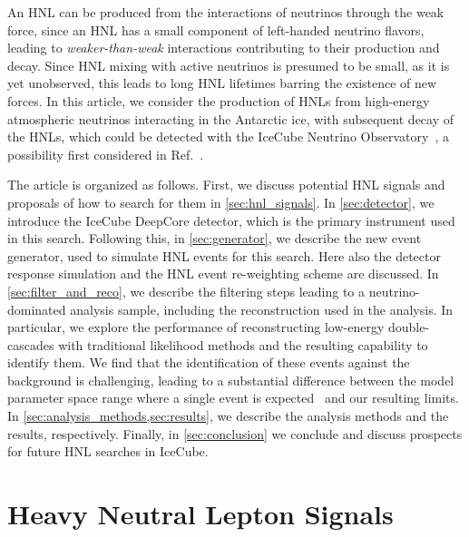 \documentclass[
    aps,
    prd,
    reprint,
    amsmath,
    amssymb,
    nofootinbib,
    superscriptaddress,
    floatfix
]{revtex4-2}
\begin{document}
An HNL can be produced from the interactions of neutrinos through the weak force, since an HNL has a small component of left-handed neutrino flavors, leading to \textit{weaker-than-weak} interactions contributing to their production and decay.
Since HNL mixing with active neutrinos is presumed to be small, as it is yet unobserved, this leads to long HNL lifetimes barring the existence of new forces.
In this article, we consider the production of HNLs from high-energy atmospheric neutrinos interacting in the Antarctic ice, with subsequent decay of the HNLs, which could be detected with the IceCube Neutrino Observatory~\cite{IceCube:2016zyt}, a possibility first considered in Ref.~\cite{Coloma:2017ppo}.

The article is organized as follows.
First, we discuss potential HNL signals and proposals of how to search for them in \cref{sec:hnl_signals}.
In \cref{sec:detector}, we introduce the IceCube DeepCore detector, which is the primary instrument used in this search.
Following this, in \cref{sec:generator}, we describe the new event generator, used to simulate HNL events for this search.
Here also the detector response simulation and the HNL event re-weighting scheme are discussed.
In \cref{sec:filter_and_reco}, we describe the filtering steps leading to a neutrino-dominated analysis sample, including the reconstruction used in the analysis.
In particular, we explore the performance of reconstructing low-energy double-cascades with traditional likelihood methods and the resulting capability to identify them.
We find that the identification of these events against the background is challenging, leading to a substantial difference between the model parameter space range where a single event is expected~\cite{Coloma:2017ppo, Boiarska:2021yho} and our resulting limits.
In \cref{sec:analysis_methods,sec:results}, we describe the analysis methods and the results, respectively. 
Finally, in \cref{sec:conclusion} we conclude and discuss prospects for future HNL searches in IceCube.




\section{\label{sec:hnl_signals}Heavy Neutral Lepton Signals}
\end{document}
